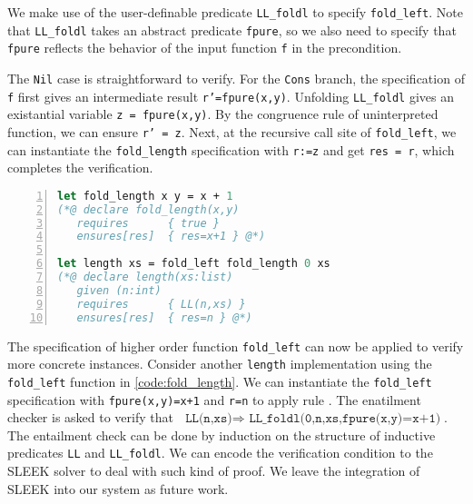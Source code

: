 We make use of the user-definable predicate \texttt{LL\_foldl} to specify \texttt{fold\_left}. Note that \texttt{LL\_foldl} takes an abstract predicate \texttt{fpure}, so we also need to specify that \texttt{fpure} reflects the behavior of the input function \texttt{f} in the precondition. 

The \texttt{Nil} case is straightforward to verify. For the \texttt{Cons} branch, the specification of \texttt{f} first gives an intermediate result \texttt{r'=fpure(x,y)}. Unfolding \texttt{LL\_foldl} gives an existantial variable \texttt{z = fpure(x,y)}. By the congruence rule of uninterpreted function, we can ensure \texttt{r' = z}.  Next, at the recursive call site of \texttt{fold\_left}, we can instantiate the \texttt{fold\_length} specification with \texttt{r:=z} and get \texttt{res = r}, which completes the verification.


\begin{lstlisting}[language=Caml, mathescape=true, xleftmargin=2em, aboveskip=1em, xrightmargin=1em, numbers=left, frame = {TB}, caption=Application of \texttt{fold\_left}, label=code:fold_length]
let fold_length x y = x + 1
(*@ declare fold_length(x,y)
   requires      { true }
   ensures[res]  { res=x+1 } @*)

let length xs = fold_left fold_length 0 xs
(*@ declare length(xs:list)
   given (n:int)
   requires      { LL(n,xs) }
   ensures[res]  { res=n } @*)
\end{lstlisting}

The specification of higher order function \texttt{fold\_left} can now be applied to verify more concrete instances. Consider another \texttt{length} implementation using the \texttt{fold\_left} function in \autoref{code:fold_length}. We can instantiate the \texttt{fold\_left} specification with \texttt{fpure(x,y)=x+1} and \texttt{r=n} to apply rule . The enatilment checker is asked to verify that $\texttt{ LL(n,xs)} \Rightarrow \texttt{ LL\_foldl(0,n,xs,fpure(x,y)=x+1)} $. The entailment check can be done by induction on the structure of inductive predicates \texttt{LL} and \texttt{LL\_foldl}. We can encode the verification condition to the SLEEK solver to deal with such kind of proof. We leave the integration of SLEEK into our system as future work.
